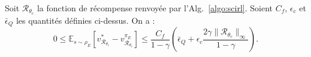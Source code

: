 \documentclass[english,utf8]{./hermes-journal}
\newcommand{\R}{\mathcal{R}}
\newcommand{\E}{\mathbb{E}}
\begin{document}
\begin{theorem}
  \label{th}
  Soit $\R_{\theta_c}$ la fonction de récompense renvoyée par l'Alg.~\ref{algo:scirl}. Soient $C_f$, $\epsilon_c$
  et $\bar{\epsilon}_Q$ les quantités définies ci-dessus. On a :
  \begin{equation}
    0\leq
    \E_{s\sim\rho_E}[v^*_{\R_{\theta_c}}-v^{\pi_E}_{\R_{\theta_c}}]
    \leq \frac{C_f}{1-\gamma}\left(\bar{\epsilon}_Q +
    \epsilon_c\frac{2\gamma\|\R_{\theta_c}\|_\infty}{1-\gamma}
    \right).
  \end{equation}
\end{theorem}
\end{document}

